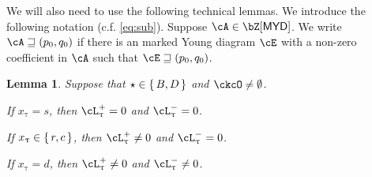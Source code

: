 \documentclass[12pt,a4paper]{amsart}
\def\MYD{{\mathsf{MYD}}}
\numberwithin{equation}{section}
\newtheorem{lem}[thm]{Lemma}
\theoremstyle{remark}
\begin{document}
\smallskip

We will also need to use the following technical lemmas. We introduce the following notation (c.f. \eqref{eq:sub}).
Suppose $\cA\in \bZ[\MYD]$. We write $\cA \sqsupseteq (p_{0},q_{0})$ if there is an marked Young diagram $\cE$ with
a non-zero coefficient in $\cA$ such that $\cE\sqsupseteq (p_{0},q_{0})$.


\begin{lem}\label{lem:BD2}
Suppose that $\star \in \set{B,D}$ and $\ckcO \neq \emptyset$.
\begin{enuma}
  \item If $x_{\uptau}=s$, then $\ac_{\uptau}^{+} =0$ and $\ac_{\uptau}^{-}=0$.
  \item If $x_{\uptau}\in \set{r,c}$, then $\ac_{\uptau}^{+} \neq 0$ and $\ac_{\uptau}^{-}=0$.
  \item If $x_{\uptau}=d$, then $\ac_{\uptau}^{+} \neq 0$ and
  $\ac_{\uptau}^{-}\neq 0$.
\end{enuma}
\end{lem}
\end{document}

